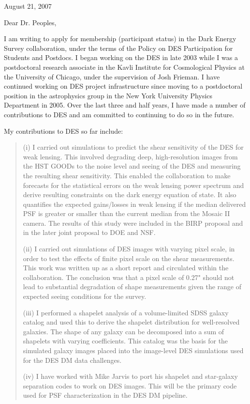 \documentclass[12pt]{letter}
\begin{document}
\hfill August 21,  2007
\newline

Dear Dr. Peoples,

I am writing to apply for membership (participant status) in the Dark Energy
Survey collaboration, under the terms of the Policy on DES Participation for
Students and Postdocs. I began working on the DES in late 2003 while I was a
postdoctoral research associate in the Kavli Institute for Cosmological Physics
at the University of Chicago, under the supervision of Josh Frieman. I have
continued working on DES project infrastructure since moving to a postdoctoral
position in the astrophysics group in the New York University Physics
Department in 2005.  Over the last three and half years, I have made a number
of contributions to DES and am committed to continuing to do so in the future.

My contributions to DES so far include:

\begin{quotation}
(i) I carried out simulations to predict the shear sensitivity of the DES for
weak lensing. This involved degrading deep, high-resolution images from the HST
GOODs to the noise level and seeing of the DES and measuring the resulting
shear sensitivity. This enabled the collaboration to make forecasts for the
statistical errors on the weak lensing power spectrum and derive resulting
constraints on the dark energy equation of state. It also quantifies the
expected gains/losses in weak lensing if the median delivered PSF is greater or
smaller than the current median from the Mosaic II camera. The results of this
study were included in the BIRP proposal and in the later joint proposal to DOE
and NSF. 
\newline

(ii) I carried out simulations of DES images with varying pixel scale, in order
to test the effects of finite pixel scale on the shear measurements.  This work
was written up as a short report and circulated within the collaboration. The
conclusion was that a pixel scale of 0.27" should not lead to substantial
degradation of shape measurements given the range of expected seeing conditions
for the survey.
\newline

(iii) I performed a shapelet analysis of a volume-limited SDSS galaxy catalog
and used this to derive the shapelet distribution for well-resolved galaxies.
The shape of any galaxy can be decomposed into a sum of shapelets with varying
coefficients.  This catalog was the basis for the simulated galaxy images
placed into the image-level DES simulations used for the DES DM data
challenges.
\newline

(iv) I have worked with Mike Jarvis to port his shapelet and star-galaxy
separation codes to work on DES images. This will be the primary code used for
PSF characterization in the DES DM pipeline.
\end{quotation}
\end{document}
